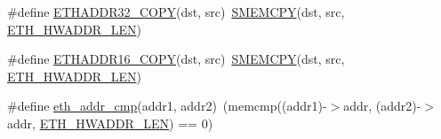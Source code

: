 \begin{DoxyCompactItemize}
\#define \hyperlink{openmote-cc2538_2lwip_2src_2include_2lwip_2prot_2ethernet_8h_a0622da8fb6eb72cd4cd7c3ea4f5a5b79}{E\+T\+H\+A\+D\+D\+R32\+\_\+\+C\+O\+PY}(dst,  src)~\hyperlink{group__lwip__opts__memcpy_ga8c6e3c1e4f74acb16376188dbf8909ec}{S\+M\+E\+M\+C\+PY}(dst, src, \hyperlink{openmote-cc2538_2lwip_2src_2include_2lwip_2prot_2ethernet_8h_ac9426049770b40fcd9556ffbd7e56907}{E\+T\+H\+\_\+\+H\+W\+A\+D\+D\+R\+\_\+\+L\+EN})
\item 
\#define \hyperlink{openmote-cc2538_2lwip_2src_2include_2lwip_2prot_2ethernet_8h_a10cbd9cd91e7e0ebed3a1159e385c037}{E\+T\+H\+A\+D\+D\+R16\+\_\+\+C\+O\+PY}(dst,  src)~\hyperlink{group__lwip__opts__memcpy_ga8c6e3c1e4f74acb16376188dbf8909ec}{S\+M\+E\+M\+C\+PY}(dst, src, \hyperlink{openmote-cc2538_2lwip_2src_2include_2lwip_2prot_2ethernet_8h_ac9426049770b40fcd9556ffbd7e56907}{E\+T\+H\+\_\+\+H\+W\+A\+D\+D\+R\+\_\+\+L\+EN})
\item 
\#define \hyperlink{openmote-cc2538_2lwip_2src_2include_2lwip_2prot_2ethernet_8h_aa19e3e4c174d49c6062f463dfa68bbbc}{eth\+\_\+addr\+\_\+cmp}(addr1,  addr2)~(memcmp((addr1)-\/$>$addr, (addr2)-\/$>$addr, \hyperlink{openmote-cc2538_2lwip_2src_2include_2lwip_2prot_2ethernet_8h_ac9426049770b40fcd9556ffbd7e56907}{E\+T\+H\+\_\+\+H\+W\+A\+D\+D\+R\+\_\+\+L\+EN}) == 0)
\end{DoxyCompactItemize}
